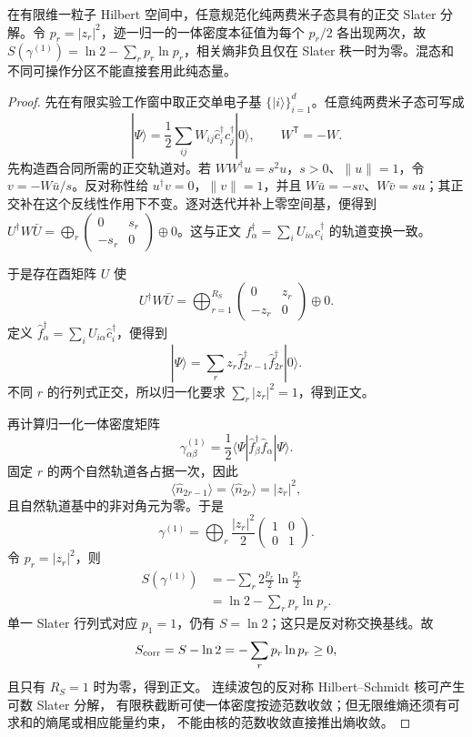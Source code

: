 \begin{theorem}
在有限维一粒子 Hilbert 空间中，任意规范化纯两费米子态具有的正交 Slater 分解。令 $p_r=|z_r|^2$，迹一归一的一体密度本征值为每个 $p_r/2$ 各出现两次，故 $S(\gamma^{(1)})=\ln2-\sum_rp_r\ln p_r$，相关熵非负且仅在 Slater 秩一时为零。混态和不同可操作分区不能直接套用此纯态量。
\end{theorem}
\begin{proof}
先在有限实验工作窗中取正交单电子基 $\{|i\rangle\}_{i=1}^{d}$。任意纯两费米子态可写成
\[
|\Psi\rangle
=\frac12\sum_{ij}W_{ij}\hat c_i^\dagger\hat c_j^\dagger|0\rangle,
\qquad W^{\mathsf T}=-W.
\]
先构造酉合同所需的正交轨道对。若 $WW^\dagger u=s^2u$，$s>0$、$\|u\|=1$，令 $v=-W\bar u/s$。反对称性给 $u^\dagger v=0$，$\|v\|=1$，并且 $W\bar u=-sv$、$W\bar v=su$；其正交补在这个反线性作用下不变。逐对迭代并补上零空间基，便得到 $U^\dagger W\bar U=\bigoplus_r\left(\begin{smallmatrix}0&s_r\\-s_r&0\end{smallmatrix}\right)\oplus0$。这与正文 $f_\alpha^\dagger=\sum_iU_{i\alpha}c_i^\dagger$ 的轨道变换一致。

于是存在酉矩阵 $U$ 使
\[
U^\dagger W\bar U
=\bigoplus_{r=1}^{R_S}
\begin{pmatrix}0&z_r\\-z_r&0\end{pmatrix}\oplus0.
\]
定义 $\hat f_\alpha^\dagger=\sum_iU_{i\alpha}\hat c_i^\dagger$，便得到
\[
|\Psi\rangle
=\sum_rz_r\hat f_{2r-1}^\dagger\hat f_{2r}^\dagger|0\rangle.
\]
不同 $r$ 的行列式正交，所以归一化要求 $\sum_r|z_r|^2=1$，得到正文。

再计算归一化一体密度矩阵
\[
\gamma^{(1)}_{\alpha\beta}
=\frac12\langle\Psi|\hat f_\beta^\dagger\hat f_\alpha|\Psi\rangle.
\]
固定 $r$ 的两个自然轨道各占据一次，因此
\[
\langle\hat n_{2r-1}\rangle
=\langle\hat n_{2r}\rangle
=|z_r|^2,
\]
且自然轨道基中的非对角元为零。于是
\[
\gamma^{(1)}
=\bigoplus_r\frac{|z_r|^2}{2}
\begin{pmatrix}1&0\\0&1\end{pmatrix}.
\]
令 $p_r=|z_r|^2$，则
\begin{align*}
S(\gamma^{(1)})
&=-\sum_r2\frac{p_r}{2}\ln\frac{p_r}{2}\\
&=\ln2-\sum_rp_r\ln p_r.
\end{align*}
单一 Slater 行列式对应 $p_1=1$，仍有 $S=\ln2$；这只是反对称交换基线。故
\[
S_{\rm corr}=S-\ln2=-\sum_rp_r\ln p_r\ge0,
\]
且只有 $R_S=1$ 时为零，得到正文。
连续波包的反对称 Hilbert--Schmidt 核可产生可数 Slater 分解，
有限秩截断可使一体密度按迹范数收敛；但无限维熵还须有可求和的熵尾或相应能量约束，
不能由核的范数收敛直接推出熵收敛。

\end{proof}


